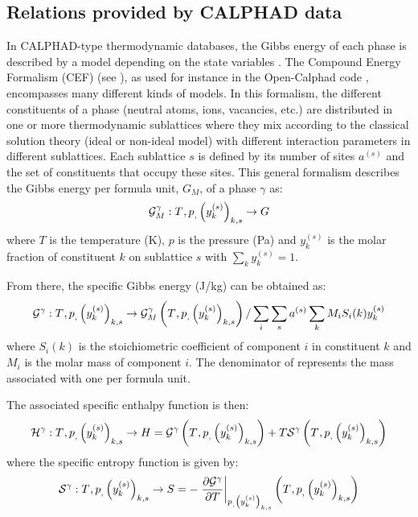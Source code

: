 \subsection{Relations provided by CALPHAD data}

In CALPHAD-type thermodynamic databases, the Gibbs energy of each phase is described by a model depending on the state variables \cite{Lukas2007}. The Compound Energy Formalism (CEF) (see \cite{Hillert2001}), as used for instance in the Open-Calphad code \cite{Sundman2015}, encompasses many different kinds of models. In this formalism, the different constituents of a phase (neutral atoms, ions, vacancies, etc.) are distributed in one or more thermodynamic sublattices where they mix according to the classical solution theory (ideal or non-ideal model) with different interaction parameters in different sublattices. Each sublattice $s$ is defined by its number of sites $a^{(s)}$ and the set of constituents that occupy these sites. This general formalism describes the Gibbs energy per formula unit, $G_M$, of a phase $\gamma$ as:
\begin{equation}
 \Mc{G}_{M}^{\gamma}: \temperature{}, \pressure, \left(y_{k}^{(s)}\right)_{k,s} \rightarrow G
\end{equation}
where $T$ is the temperature (K), $p$ is the pressure (Pa) and $y_{k}^{(s)}$ is the molar fraction of constituent $k$ on sublattice $s$ with $\sum_k y_{k}^{(s)} = 1$. 

From there, the specific Gibbs energy (J/kg) can be obtained as:
\begin{equation}
 \Mc{G}^{\gamma}: \temperature{}, \pressure, \left(y_{k}^{(s)}\right)_{k,s} \rightarrow \Mc{G}_{M}^{\gamma}\left(\temperature{}, \pressure, \left(y_{k}^{(s)}\right)_{k,s}\right) / \sum_i \sum_s a^{(s)} \sum_k M_i S_i(k) y_{k}^{(s)} \label{eq:G1}
\end{equation}
where $S_i(k)$ is the stoichiometric coefficient of component $i$ in constituent $k$ and $M_i$ is the molar mass of component $i$. The denominator of  represents the mass associated with one per formula unit.

The associated specific enthalpy function is then:
\begin{equation}
 \Mc{H}^{\gamma}: \temperature{}, \pressure, \left(y_{k}^{(s)}\right)_{k,s} \rightarrow H = \Mc{G}^{\gamma}\left(\temperature{}, \pressure, \left(y_{k}^{(s)}\right)_{k,s}\right) + T \Mc{S}^{\gamma}\left(\temperature{}, \pressure, \left(y_{k}^{(s)}\right)_{k,s}\right)  \label{eq:Hm1}
\end{equation}
where the specific entropy function is given by:
\begin{equation}
\Mc{S}^{\gamma}: \temperature{}, \pressure, \left(y_{k}^{(s)}\right)_{k,s} \rightarrow S = -\left.\frac{\partial \Mc{G}^{\gamma}}{\partial T}\right|_{\pressure, \left(y_{k}^{(s)}\right)_{k,s}} \left(\temperature{}, \pressure, \left(y_{k}^{(s)}\right)_{k,s}\right)
\end{equation}

